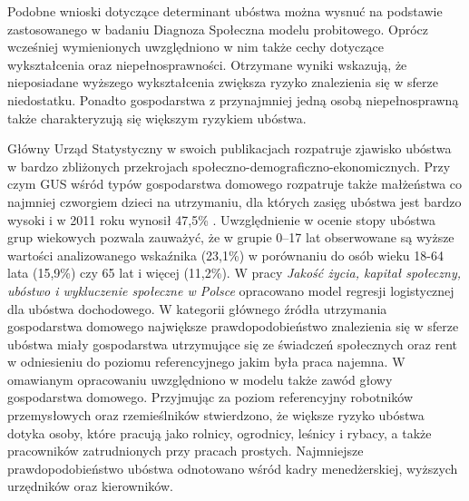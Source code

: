 Podobne wnioski dotyczące determinant ubóstwa można wysnuć na podstawie zastosowanego w badaniu Diagnoza Społeczna modelu probitowego. Oprócz wcześniej wymienionych uwzględniono w nim także cechy dotyczące wykształcenia oraz niepełnosprawności. Otrzymane wyniki wskazują, że nieposiadane wyższego wykształcenia zwiększa ryzyko znalezienia się w sferze niedostatku. Ponadto gospodarstwa z przynajmniej jedną osobą niepełnosprawną także charakteryzują się większym ryzykiem ubóstwa.

Główny Urząd Statystyczny w swoich publikacjach rozpatruje zjawisko ubóstwa w bardzo zbliżonych przekrojach społeczno-demograficzno-ekonomicznych. Przy czym GUS wśród typów gospodarstwa domowego rozpatruje także małżeństwa co najmniej czworgiem dzieci na utrzymaniu, dla których zasięg ubóstwa jest bardzo wysoki i w 2011 roku wynosił 47,5\% \citep{ubostwo-gus2013}. Uwzględnienie w ocenie stopy ubóstwa grup wiekowych pozwala zauważyć, że w grupie 0--17 lat obserwowane są wyższe wartości analizowanego wskaźnika (23,1\%) w porównaniu do osób wieku 18-64 lata (15,9\%) czy 65 lat i więcej (11,2\%). W pracy \textit{Jakość życia, kapitał społeczny, ubóstwo i wykluczenie społeczne w Polsce} \citep{jakosc-gus2013} opracowano model regresji logistycznej dla ubóstwa dochodowego. W kategorii głównego źródła utrzymania gospodarstwa domowego największe prawdopodobieństwo znalezienia się w sferze ubóstwa miały gospodarstwa utrzymujące się ze świadczeń społecznych oraz rent w odniesieniu do poziomu referencyjnego jakim była praca najemna. W omawianym opracowaniu uwzględniono w modelu także zawód głowy gospodarstwa domowego. Przyjmując za poziom referencyjny robotników przemysłowych oraz rzemieślników stwierdzono, że większe ryzyko ubóstwa dotyka osoby, które pracują jako rolnicy, ogrodnicy, leśnicy i rybacy, a także pracowników zatrudnionych przy pracach prostych. Najmniejsze prawdopodobieństwo ubóstwa odnotowano wśród kadry menedżerskiej, wyższych urzędników oraz kierowników.


